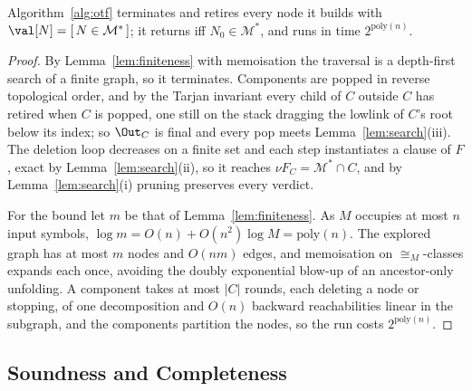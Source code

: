 \begin{theorem}\label{thm:alg}
Algorithm~\ref{alg:otf} terminates and retires every node it builds with
$\val[N]=[\,N\in\mathcal M^{*}\,]$; it returns \SAT{} iff $N_0\in\mathcal M^{*}$, and runs in time
$2^{\mathrm{poly}(n)}$.
\end{theorem}
\begin{proof}
By Lemma~\ref{lem:finiteness} with memoisation the traversal is a depth-first search of a finite
graph, so it terminates. Components are popped in reverse topological order, and by the Tarjan
invariant every child of $C$ outside $C$ has retired when $C$ is popped, one still on the stack
dragging the lowlink of $C$'s root below its index; so $\Out_C$ is final and every pop meets
Lemma~\ref{lem:search}(iii). The deletion loop decreases on a finite set and each step instantiates a
clause of $F$, exact by Lemma~\ref{lem:search}(ii), so it reaches $\nu F_C=\mathcal M^{*}\cap C$, and
by Lemma~\ref{lem:search}(i) pruning preserves every verdict.

For the bound let $m$ be that of Lemma~\ref{lem:finiteness}. As $M$ occupies at most $n$ input
symbols, $\log m=O(n)+O(n^{2})\log M=\mathrm{poly}(n)$. The explored graph has at most $m$ nodes and
$O(nm)$ edges, and memoisation on $\cong_M$-classes expands each once, avoiding the doubly
exponential blow-up of an ancestor-only unfolding. A component takes at most $|C|$ rounds,
each deleting a node or stopping, of one decomposition and $O(n)$ backward reachabilities linear in
the subgraph, and the components partition the nodes, so the run costs $2^{\mathrm{poly}(n)}$.
\end{proof}

\subsection{Soundness and Completeness}\label{ss:sound}

